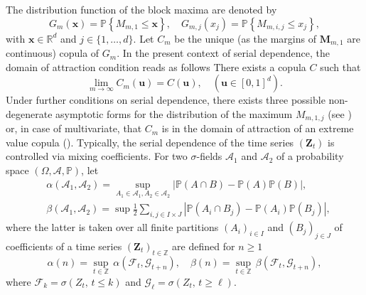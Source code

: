 \documentclass[11pt]{article}
\theoremstyle{definition}
\newenvironment{Assumption}[1]
  {\renewcommand\theinnerassumption{#1}\innerassumption}
  {\endinnerassumption}
\begin{document}
	The distribution function of the block maxima are denoted by
	\begin{equation*}
		G_m(\textbf{x}) = \mathbb{P}\left\{ M_{m,1} \leq \textbf{x} \right\}, \quad G_{m,j} (x_j) = \mathbb{P}\left\{ M_{m,i,j} \leq x_j \right\},
	\end{equation*}
	with $\textbf{x} \in \mathbb{R}^d$ and $j \in \{1,\dots,d\}$. Let $C_m$ be the unique (as the margins of $\textbf{M}_{m,1}$ are continuous) copula of $G_m$. In the present context of serial dependence, the domain of attraction condition reads as follows 
	\begin{Assumption}{B}
		\label{ass:domain}
		There exists a copula $C$ such that
		\begin{equation*}
			\underset{m \rightarrow \infty}{\lim} C_m(\textbf{u}) = C(\textbf{u}), \quad (\textbf{u} \in [0,1]^d).
		\end{equation*}
	\end{Assumption}
	Under further conditions on serial dependence, there exists three possible non-degenerate asymptotic forms for the distribution of the maximum $M_{m,1,j}$ (see \cite{leadbetter1974extreme}) or, in case of multivariate, that $C_m$ is in the domain of attraction of an extreme value copula (\cite{hsing1989extreme}). Typically, the serial dependence of the time series $(\textbf{Z}_t)$ is controlled via mixing coefficients. For two $\sigma$-fields $\mathcal{A}_1$ and $\mathcal{A}_2$ of a probability space $(\Omega, \mathcal{A}, \mathbb{P})$, let
	\begin{align*}
		&\alpha(\mathcal{A}_1, \mathcal{A}_2) = \underset{A_1 \in \mathcal{A}_1, A_2 \in \mathcal{A}_2}{\sup} \left| \mathbb{P}(A \cap B) - \mathbb{P}(A) \mathbb{P}(B) \right|, \\ &\beta(\mathcal{A}_1, \mathcal{A}_2) = \sup \frac{1}{2} \sum_{i,j \in I \times J} \left| \mathbb{P}(A_i \cap B_j) - \mathbb{P}(A_i) \mathbb{P}(B_j) \right|,
	\end{align*}
	where the latter is taken over all finite partitions $(A_i)_{i\in I}$ and $(B_j)_{j \in J}$ of coefficients of a time series $(\textbf{Z}_t)_{t \in \mathbb{Z}}$ are defined for $n \geq 1$
	\begin{equation*}
		\alpha(n) = \underset{t \in \mathbb{Z}}{\sup} \, \alpha(\mathcal{F}_t, \mathcal{G}_{t+n}), \quad \beta(n) = \underset{t \in \mathbb{Z}}{\sup} \, \beta(\mathcal{F}_t, \mathcal{G}_{t+n}),
	\end{equation*}
	where $\mathcal{F}_k = \sigma(Z_t, \,  t \leq k)$ and $\mathcal{G}_\ell = \sigma(Z_t, \, t \geq \ell)$.
	
\end{document}
